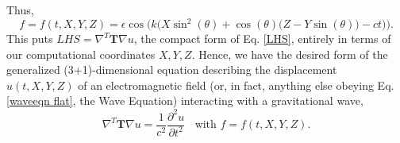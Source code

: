 \documentclass{article}
\begin{document}
Thus, \begin{equation} \label{f}
f=f(t,X,Y,Z)=\epsilon \cos\big(k\big(X \sin ^2(\theta )+\cos (\theta ) \big(Z-Y \sin (\theta )\big)-ct\big)\big).
\end{equation}
This puts $LHS = \nabla^T \textbf{T} \nabla u$, the compact form of Eq. \ref{LHS}, entirely in terms of our computational coordinates $X,Y,Z$. Hence, we have the desired form of the generalized (3+1)-dimensional equation describing the displacement $u(t,X,Y,Z)$ of an electromagnetic field (or, in fact, anything else obeying Eq. \ref{waveeqn flat}, the Wave Equation) interacting with a gravitational wave,
\begin{equation}\label{main eqn}
\boxed{
\nabla^T \textbf{T} \nabla u = \frac{1}{c^2}\frac{\partial^2 u}{\partial t^2} \ \ \ \ \mbox{with } f=f(t,X,Y,Z).
}
\end{equation}
\end{document}
